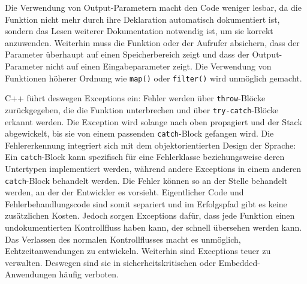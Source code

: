 Die Verwendung von Output-Parametern macht den Code weniger lesbar, da die Funktion nicht mehr durch ihre Deklaration automatisch dokumentiert ist, sondern das Lesen weiterer Dokumentation notwendig ist, um sie korrekt anzuwenden. Weiterhin muss die Funktion oder der Aufrufer absichern, dass der Parameter überhaupt auf einen Speicherbereich zeigt und dass der Output-Parameter nicht auf einen Eingabeparameter zeigt. Die Verwendung von Funktionen höherer Ordnung wie \texttt{map()} oder \texttt{filter()} wird unmöglich gemacht.

C++ führt deswegen Exceptions ein: Fehler werden über \texttt{throw}-Blöcke zurückgegeben, die die Funktion unterbrechen und über \texttt{try-catch}-Blöcke erkannt werden. Die Exception wird solange nach oben propagiert und der Stack abgewickelt, bis sie von einem passenden \texttt{catch}-Block gefangen wird. Die Fehlererkennung integriert sich mit dem objektorientierten Design der Sprache: Ein \texttt{catch}-Block kann spezifisch für eine Fehlerklasse beziehungsweise deren Untertypen implementiert werden, während andere Exceptions in einem anderen \texttt{catch}-Block behandelt werden. Die Fehler können so an der Stelle behandelt werden, an der der Entwickler es vorsieht. Eigentlicher Code und Fehlerbehandlungscode sind somit separiert und im Erfolgspfad gibt es keine zusätzlichen Kosten. Jedoch sorgen Exceptions dafür, dass jede Funktion einen undokumentierten Kontrollfluss haben kann, der schnell übersehen werden kann. Das Verlassen des normalen Kontrollflusses macht es unmöglich, Echtzeitanwendungen zu entwickeln. Weiterhin sind Exceptions teuer zu verwalten. Deswegen sind sie in sicherheitskritischen oder Embedded-Anwendungen häufig verboten.

\begin{figure}[htp]
	\centering
	
	\label{fig:exceptions}
\end{figure}

